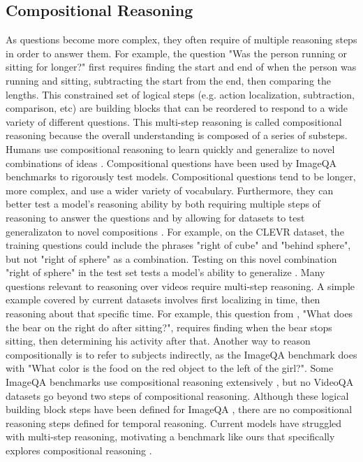 \documentclass{article}
\newcommand{\mgm}[1]{{\color{cyan}{mgm: #1}}}
\begin{document}
\subsection{Compositional Reasoning}

As questions become more complex, they often require of multiple reasoning steps in order to answer them. For example, the question "Was the person running or sitting for longer?" first requires finding the start and end of when the person was running and sitting, subtracting the start from the end, then comparing the lengths. This constrained set of logical steps (e.g. action localization, subtraction, comparison, etc) are building blocks that can be reordered to respond to a wide variety of different questions. \mgm{Figure?} This multi-step reasoning is called compositional reasoning because the overall understanding is composed of a series of substeps. Humans use compositional reasoning to learn quickly and generalize to novel combinations of ideas \cite{tani2014self, lake2018generalization, schulz2016probing}. Compositional questions have been used by ImageQA benchmarks to rigorously test models. Compositional questions tend to be longer, more complex, and use a wider variety of vocabulary. Furthermore, they can better test a model's reasoning ability by both requiring multiple steps of reasoning to answer the questions and by allowing for datasets to test generalizaton to novel compositions \cite{johnson2017clevr, hudson2019gqa}. For example, on the CLEVR dataset, the training questions could include the phrases "right of cube" and "behind sphere", but not "right of sphere" as a combination. Testing on this novel combination "right of sphere" in the test set tests a model's ability to generalize \cite{lake2018generalization, johnson2017clevr}. Many questions relevant to reasoning over videos require multi-step reasoning. A simple example covered by current datasets involves first localizing in time, then reasoning about that specific time. For example, this question from \cite{jang2017tgif}, "What does the bear on the right do after sitting?", requires finding when the bear stops sitting, then determining his activity after that. Another way to reason compositionally is to refer to subjects indirectly, as the ImageQA benchmark \cite{hudson2019gqa} does with "What color is the food on the red object to the left of the girl?". Some ImageQA benchmarks use compositional reasoning extensively \cite{johnson2017clevr, hudson2019gqa}, but no VideoQA datasets go beyond two steps of compositional reasoning. Although these logical building block steps have been defined for ImageQA \cite{cheng2015break}, there are no compositional reasoning steps defined for temporal reasoning. Current models have struggled with multi-step reasoning, motivating a benchmark like ours that specifically explores compositional reasoning \cite{fan2019heterogeneous}.
\end{document}
